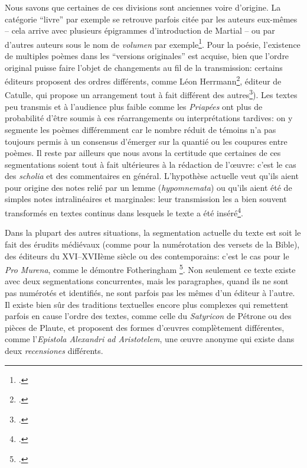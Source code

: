 Nous savons que certaines de ces divisions sont anciennes voire d'origine. La catégorie \enquote{livre} par exemple se retrouve parfois citée par les auteurs eux-mêmes -- cela arrive avec plusieurs épigrammes d'introduction de Martial -- ou par d'autres auteurs sous le nom de \textit{volumen} par exemple\footcite[p. 13]{canfora_conservazione_2016}. Pour la poésie, l'existence de multiples poèmes dans les \enquote{versions originales} est acquise, bien que l'ordre original puisse faire l'objet de changements au fil de la transmission: certains éditeurs proposent des ordres différents, comme Léon Herrmann\footcite{catulle_les_1957}, éditeur de Catulle, qui propose un arrangement tout à fait différent des autres\footcite{catulle_poesies_1932}). Les textes peu transmis et à l'audience plus faible comme les \textit{Priapées} ont plus de probabilité d'être soumis à ces réarrangements ou interprétations tardives: on y segmente les poèmes différemment car le nombre réduit de témoins n'a pas toujours permis à un consensus d'émerger sur la quantié ou les coupures entre poèmes. Il reste par ailleurs que nous avons la certitude que certaines de ces segmentations soient tout à fait ultérieures à la rédaction de l'œuvre: c'est le cas des \textit{scholia} et des commentaires en général. L'hypothèse actuelle veut qu'ils aient pour origine des notes relié par un lemme (\textit{hypomnemata}) ou qu'ils aient été de simples notes intralinéaires et marginales: leur transmission les a bien souvent transformés en textes continus dans lesquels le texte a été inséré\footcite{bureau_quelques_2012}. 

Dans la plupart des autres situations, la segmentation actuelle du texte est soit le fait des érudits médiévaux (comme pour la numérotation des versets de la Bible), des éditeurs du XVI--XVIIème siècle ou des contemporains: c'est le cas pour le \textit{Pro Murena}, comme le démontre Fotheringham \footcite{fotheringham_numbers_2007}. Non seulement ce texte existe avec deux segmentations concurrentes, mais les paragraphes, quand ils ne sont pas numérotés et identifiés, ne sont parfois pas les mêmes d'un éditeur à l'autre. Il existe bien sûr des traditions textuelles encore plus complexes qui remettent parfois en cause l'ordre des textes, comme celle du \textit{Satyricon} de Pétrone ou des pièces de Plaute, et proposent des formes d'œuvres complètement différentes, comme l'\textit{Epistola Alexandri ad Aristotelem}, une œuvre anonyme qui existe dans deux \textit{recensiones} différents.

